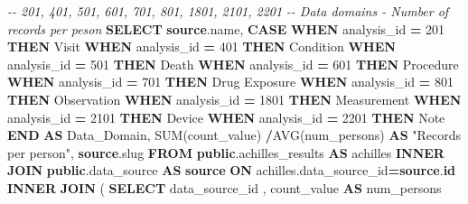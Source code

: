 \documentclass[
]{book}
\newenvironment{Shaded}{\begin{snugshade}}{\end{snugshade}}
\newcommand{\CommentTok}[1]{\textcolor[rgb]{0.56,0.35,0.01}{\textit{#1}}}
\newcommand{\ControlFlowTok}[1]{\textcolor[rgb]{0.13,0.29,0.53}{\textbf{#1}}}
\newcommand{\DecValTok}[1]{\textcolor[rgb]{0.00,0.00,0.81}{#1}}
\newcommand{\FunctionTok}[1]{\textcolor[rgb]{0.00,0.00,0.00}{#1}}
\newcommand{\KeywordTok}[1]{\textcolor[rgb]{0.13,0.29,0.53}{\textbf{#1}}}
\newcommand{\NormalTok}[1]{#1}
\newcommand{\OperatorTok}[1]{\textcolor[rgb]{0.81,0.36,0.00}{\textbf{#1}}}
\newcommand{\OtherTok}[1]{\textcolor[rgb]{0.56,0.35,0.01}{#1}}
\newcommand{\StringTok}[1]{\textcolor[rgb]{0.31,0.60,0.02}{#1}}
\begin{document}
\begin{Shaded}
\begin{Highlighting}[]
\CommentTok{{-}{-} 201, 401, 501, 601, 701, 801, 1801, 2101, 2201   }
\CommentTok{{-}{-} Data domains {-} Number of records per peson}
\KeywordTok{SELECT} 
    \KeywordTok{source}\NormalTok{.name,}
    \ControlFlowTok{CASE} 
      \ControlFlowTok{WHEN}\NormalTok{ analysis\_id }\OperatorTok{=} \DecValTok{201} \ControlFlowTok{THEN} \StringTok{\textquotesingle{}Visit\textquotesingle{}}
      \ControlFlowTok{WHEN}\NormalTok{ analysis\_id }\OperatorTok{=} \DecValTok{401} \ControlFlowTok{THEN} \StringTok{\textquotesingle{}Condition\textquotesingle{}}
      \ControlFlowTok{WHEN}\NormalTok{ analysis\_id }\OperatorTok{=} \DecValTok{501} \ControlFlowTok{THEN} \StringTok{\textquotesingle{}Death\textquotesingle{}}
      \ControlFlowTok{WHEN}\NormalTok{ analysis\_id }\OperatorTok{=} \DecValTok{601} \ControlFlowTok{THEN} \StringTok{\textquotesingle{}Procedure\textquotesingle{}}
      \ControlFlowTok{WHEN}\NormalTok{ analysis\_id }\OperatorTok{=} \DecValTok{701} \ControlFlowTok{THEN} \StringTok{\textquotesingle{}Drug Exposure\textquotesingle{}}
      \ControlFlowTok{WHEN}\NormalTok{ analysis\_id }\OperatorTok{=} \DecValTok{801} \ControlFlowTok{THEN} \StringTok{\textquotesingle{}Observation\textquotesingle{}}
      \ControlFlowTok{WHEN}\NormalTok{ analysis\_id }\OperatorTok{=} \DecValTok{1801} \ControlFlowTok{THEN} \StringTok{\textquotesingle{}Measurement\textquotesingle{}}
      \ControlFlowTok{WHEN}\NormalTok{ analysis\_id }\OperatorTok{=} \DecValTok{2101} \ControlFlowTok{THEN} \StringTok{\textquotesingle{}Device\textquotesingle{}}
      \ControlFlowTok{WHEN}\NormalTok{ analysis\_id }\OperatorTok{=} \DecValTok{2201} \ControlFlowTok{THEN} \StringTok{\textquotesingle{}Note\textquotesingle{}}
    \ControlFlowTok{END} \KeywordTok{AS}\NormalTok{ Data\_Domain,}
    \FunctionTok{SUM}\NormalTok{(count\_value) }\OperatorTok{/}\FunctionTok{AVG}\NormalTok{(num\_persons) }\KeywordTok{AS} \OtherTok{"Records per person"}\NormalTok{,}
    \KeywordTok{source}\NormalTok{.slug}
\KeywordTok{FROM} \KeywordTok{public}\NormalTok{.achilles\_results }\KeywordTok{AS}\NormalTok{ achilles }
    \KeywordTok{INNER} \KeywordTok{JOIN} \KeywordTok{public}\NormalTok{.data\_source }\KeywordTok{AS} \KeywordTok{source} \KeywordTok{ON} 
\NormalTok{      achilles.data\_source\_id}\OperatorTok{=}\KeywordTok{source}\NormalTok{.}\KeywordTok{id}
    \KeywordTok{INNER} \KeywordTok{JOIN}\NormalTok{ (}
        \KeywordTok{SELECT}\NormalTok{ data\_source\_id , count\_value }\KeywordTok{AS}\NormalTok{ num\_persons }

\end{Highlighting}
\end{Shaded}
\end{document}
